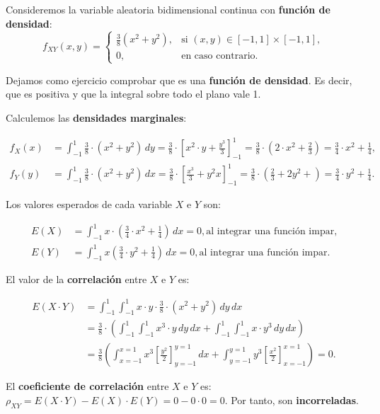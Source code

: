\documentclass[
  letterpaper,
  DIV=11,
  numbers=noendperiod]{scrreprt}
\begin{document}
Consideremos la variable aleatoria bidimensional continua con
\textbf{función de densidad}: \[
f_{XY}(x,y)=\begin{cases}
\frac{3}{8}(x^2+y^2), & \mbox{si }(x,y)\in [-1,1]\times [-1,1],\\
0, & \mbox{en caso contrario.}
\end{cases}
\]

Dejamos como ejercicio comprobar que es una \textbf{función de
densidad}. Es decir, que es positiva y que la integral sobre todo el
plano vale 1.

Calculemos las \textbf{densidades marginales}:

\[
\begin{array}{rl}
f_X(x) & = \int_{-1}^{1} \frac{3}{8}\cdot (x^2+y^2)\, dy = \frac{3}{8}\cdot\left[x^2\cdot y+\frac{y^3}{3}\right]_{-1}^1 =\frac{3}{8}\cdot\left(2 \cdot x^2+\frac{2}{3}\right)=\frac{3}{4}
\cdot x^2+\frac{1}{4}, \\
f_Y(y) & = \int_{-1}^{1} \frac{3}{8}\cdot(x^2+y^2)\, dx = \frac{3}{8}\cdot\left[\frac{x^3}{3}+y^2 x\right]_{-1}^1 =\frac{3}{8}\cdot\left(\frac{2}{3}+2 y^2+\right)=\frac{3}{4}\cdot y^2+\frac{1}{4}.
\end{array}
\]

Los valores esperados de cada variable \(X\) e \(Y\) son:

\[
\begin{array}{rl}
E(X) & =\int_{-1}^1 x \cdot\left(\frac{3}{4} \cdot x^2+\frac{1}{4}\right)\, dx =0, \mbox{al integrar una función impar,}\\
E(Y) & =\int_{-1}^1 x \left(\frac{3}{4}\cdot y^2+\frac{1}{4}\right)\, dx =0, \mbox{al integrar una función impar.}
\end{array}
\]

El valor de la \textbf{correlación} entre \(X\) e \(Y\) es:

\[
\begin{array}{rl}
E(X\cdot Y) & =\int_{-1}^1\int_{-1}^1 x \cdot y \cdot \frac{3}{8}\cdot (x^2+y^2)\, dy\, dx\\ & =\frac{3}{8}\cdot\left(\int_{-1}^1\int_{-1}^1 x^3 \cdot y\, dy \, dx+\int_{-1}^1\int_{-1}^1 x\cdot y^3\, dy \, dx\right) \\ & = \frac{3}{8} \left(\int_{x=-1}^{x=1}x^3 \left[\frac{y^2}{2}\right]_{y=-1}^{y=1}\, dx + \int_{y=-1}^{y=1}y^3 \left[\frac{x^2}{2}\right]_{x=-1}^{x=1}\right)=0.
\end{array}
\]

El \textbf{coeficiente de correlación} entre \(X\) e \(Y\) es:
\(\rho_{XY}=E(X\cdot Y)-E(X)\cdot E(Y)=0-0\cdot 0=0\). Por tanto, son
\textbf{incorreladas}.
\end{document}
